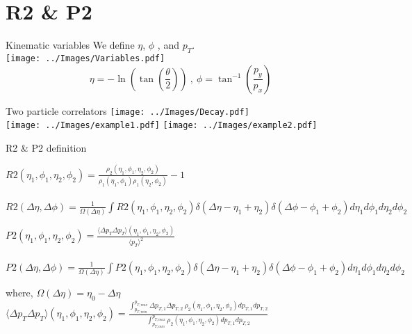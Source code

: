 \documentclass{beamer}
\begin{document}
\section{R2 \& P2}
\begin{frame}{Kinematic variables}
	We define $\eta$, $\phi$ , and $p_T$.\\
	\centering
	\texttt{[image: ../Images/Variables.pdf]}
	\[\eta=-\ln\left(\tan\left(\frac{\theta}{2}\right)\right)\ , \ \phi=\tan^{-1}\left(\frac{p_y}{p_x}\right)\]
\end{frame}
\begin{frame}{Two particle correlators}
	\centering
	\texttt{[image: ../Images/Decay.pdf]}\\
	\texttt{[image: ../Images/example1.pdf]} \qquad \texttt{[image: ../Images/example2.pdf]}
\end{frame}
\begin{frame}{R2 \& P2 definition}
	\begin{definition}
		$R2(\eta_1,\phi_1,\eta_2,\phi_2)=\frac{\rho_2(\eta_1,\phi_1,\eta_2,\phi_2)}{\rho_1(\eta_1,\phi_1)\rho_1(\eta_2,\phi_2)}-1$\\~\\
		{\tiny$R2(\Delta\eta,\Delta\phi)=\frac{1}{\Omega(\Delta\eta)}\int R2(\eta_1,\phi_1,\eta_2,\phi_2)\delta(\Delta\eta-\eta_1+\eta_2)\delta(\Delta\phi-\phi_1+\phi_2)d\eta_1 d\phi_1 d\eta_2 d\phi_2$}
	\end{definition}
	\begin{definition}
		$P2(\eta_1,\phi_1,\eta_2,\phi_2)=\frac{\langle\Delta p_T \Delta p_T \rangle(\eta_1,\phi_1,\eta_2,\phi_2)}{\langle p_T\rangle^2}$\\~\\
		{\tiny$P2(\Delta\eta,\Delta\phi)=\frac{1}{\Omega(\Delta\eta)}\int P2(\eta_1,\phi_1,\eta_2,\phi_2)\delta(\Delta\eta-\eta_1+\eta_2)\delta(\Delta\phi-\phi_1+\phi_2)d\eta_1 d\phi_1 d\eta_2 d\phi_2$}
	\end{definition}
	\begin{block}{where,}
		$\Omega(\Delta\eta)=\eta_0-\Delta\eta$\\
		$\langle\Delta p_T \Delta p_T\rangle(\eta_1,\phi_1,\eta_2,\phi_2)=\frac{\int_{p_{T,min}}^{p_{T,max}}\Delta p_{T,1}\Delta p_{T,2} \ \rho_2(\eta_1,\phi_1,\eta_2,\phi_2)d p_{T,1}d p_{T,2}}{\int_{p_{T,min}}^{p_{T,max}}\rho_2(\eta_1,\phi_1,\eta_2,\phi_2)d p_{T,1}d p_{T,2}}$
	\end{block}
\end{frame}
\end{document}
